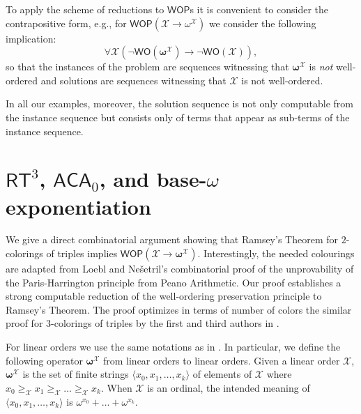 \documentclass{amsart}
\newcommand\RCA{\mathsf{RCA}}
\newcommand\ACA{\mathsf{ACA}}
\newcommand\RT{\mathsf{RT}}
\newcommand\WO{\mathsf{WO}}
\newcommand\WOP{\mathsf{WOP}}
\newcommand{\LoX}{\mathcal{X}}
\newcommand\boldomega{\pmb{\omega}}
\begin{document}
To apply the scheme of reductions to $\WOP$s it is convenient to consider the contrapositive form, e.g., 
for $\WOP(\LoX \to \omega^\LoX)$ we consider the following implication:
$$ \forall \LoX (\neg\WO(\boldomega^\LoX) \to \neg \WO(\LoX)),$$
so that the instances of the problem are sequences witnessing that $\boldomega^\LoX$ is {\em not} well-ordered and 
solutions are sequences witnessing that $\LoX$ is not well-ordered. 

In all our examples, moreover, the solution sequence is not only computable from the instance sequence
but consists only of terms that appear as sub-terms of the instance sequence. 


\section{$\RT^3$, $\ACA_0$, and base-$\omega$ exponentiation}

We give a direct combinatorial argument showing that Ramsey's Theorem for $2$-colorings of triples implies 
$\WOP(\LoX\to \boldomega^{\LoX})$. Interestingly, the needed colourings are adapted from Loebl and Ne\v{s}etril's 
\cite{Loe-Nes:92} combinatorial proof of the unprovability of the Paris-Harrington principle
from Peano Arithmetic. Our proof establishes a strong computable reduction of the well-ordering preservation 
principle to Ramsey's Theorem. The proof optimizes in terms of number of colors the similar proof for $3$-colorings of triples by the
first and third authors in \cite{Car:12}.

For linear orders we use the same notations as in \cite{Mar-Mon:11}. In particular, we define the following 
operator $\boldomega^\LoX$ from linear orders to linear orders. Given a linear order $\LoX$, 
$\boldomega^\LoX$ is the set of finite strings $\langle x_0,x_1,\dots,x_k\rangle$ of 
elements of $\LoX$ where $x_0\geq_\LoX x_1\geq_\LoX\dots\geq_\LoX x_k$. 
When $\LoX$ is an ordinal, the intended meaning
of $\langle x_0,x_1,\dots,x_k \rangle$ is $\omega^{x_0}+\dots+\omega^{x_k}$.
\end{document}
